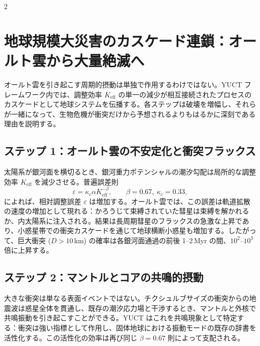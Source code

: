 \documentclass[12pt,a4paper]{article}
\begin{document}
	\begin{multicols}{2}
		
		\section{地球規模大災害のカスケード連鎖：オールト雲から大量絶滅へ}
		オールト雲を引き起こす周期的摂動は単独で作用するわけではない。YUCT フレームワーク内では、調整効率 \(K_{\mathrm{eff}}\) の単一の減少が相互接続されたプロセスのカスケードとして地球システムを伝播する。各ステップは破壊を増幅し、それらが一緒になって、生物危機が衝突だけから予想されるよりもはるかに深刻である理由を説明する。
		
		\subsection{ステップ 1：オールト雲の不安定化と衝突フラックス}
		太陽系が銀河面を横切るとき、銀河重力ポテンシャルの潮汐勾配は局所的な調整効率 \(K_{\mathrm{eff}}\) を減少させる。普遍誤差則
		\begin{equation}
			\varepsilon = \kappa_c \alpha K_{\mathrm{eff}}^{-\beta},\qquad \beta=0.67,\ \kappa_c=0.33,
		\end{equation}
		によれば、相対調整誤差 \(\varepsilon\) は増加する。オールト雲では、この誤差は軌道拡散の速度の増加として現れる：かろうじて束縛されていた彗星は束縛を解かれるか、内太陽系に注入される。結果は長周期彗星のフラックスの急激な上昇であり、小惑星帯での衝突カスケードを通じて地球横断小惑星も増加する。したがって、巨大衝突 (\(D>10\) km) の確率は各銀河面通過の前後 1–2 Myr の間、\(10^2\)–\(10^3\) 倍に上昇する。
		
		\subsection{ステップ 2：マントルとコアの共鳴的摂動}
		大きな衝突は単なる表面イベントではない。チクシュルブサイズの衝突からの地震波は惑星全体を貫通し、既存の潮汐応力場と干渉するとき、マントルと外核で共鳴振動を引き起こすことができる。YUCT はこれを共鳴現象として特定する：衝突は強い指標として作用し、固体地球における振動モードの既存の辞書を活性化する。この活性化の効率は再び同じ \(\beta = 0.67\) 則によって支配される。
		

\end{multicols}
\end{document}

